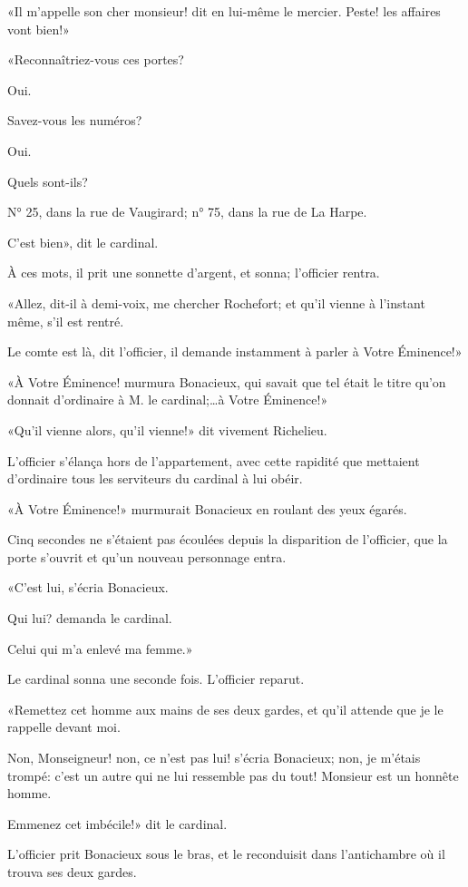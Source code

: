 «Il m'appelle son cher monsieur! dit en lui-même le mercier. Peste! les affaires vont bien!» 

«Reconnaîtriez-vous ces portes? 

\speak  Oui. 

\speak  Savez-vous les numéros? 

\speak  Oui. 

\speak  Quels sont-ils? 

\speak  N° 25, dans la rue de Vaugirard; n° 75, dans la rue de La Harpe. 

\speak  C'est bien», dit le cardinal. 

À ces mots, il prit une sonnette d'argent, et sonna; l'officier rentra. 

«Allez, dit-il à demi-voix, me chercher Rochefort; et qu'il vienne à l'instant même, s'il est rentré. 

\speak  Le comte est là, dit l'officier, il demande instamment à parler à Votre Éminence!» 

«À Votre Éminence! murmura Bonacieux, qui savait que tel était le titre qu'on donnait d'ordinaire à M. le cardinal;\dots à Votre Éminence!» 

«Qu'il vienne alors, qu'il vienne!» dit vivement Richelieu. 

L'officier s'élança hors de l'appartement, avec cette rapidité que mettaient d'ordinaire tous les serviteurs du cardinal à lui obéir. 

«À Votre Éminence!» murmurait Bonacieux en roulant des yeux égarés. 

Cinq secondes ne s'étaient pas écoulées depuis la disparition de l'officier, que la porte s'ouvrit et qu'un nouveau personnage entra. 

«C'est lui, s'écria Bonacieux. 

\speak  Qui lui? demanda le cardinal. 

\speak  Celui qui m'a enlevé ma femme.» 

Le cardinal sonna une seconde fois. L'officier reparut. 

«Remettez cet homme aux mains de ses deux gardes, et qu'il attende que je le rappelle devant moi. 

\speak  Non, Monseigneur! non, ce n'est pas lui! s'écria Bonacieux; non, je m'étais trompé: c'est un autre qui ne lui ressemble pas du tout! Monsieur est un honnête homme. 

\speak  Emmenez cet imbécile!» dit le cardinal. 

L'officier prit Bonacieux sous le bras, et le reconduisit dans l'antichambre où il trouva ses deux gardes. 

